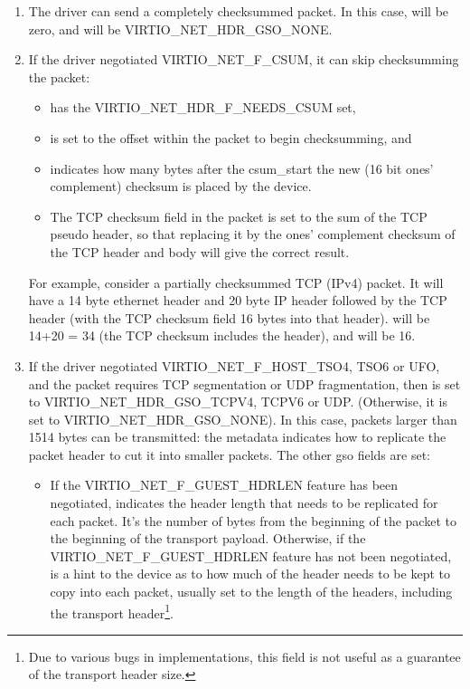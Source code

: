 \begin{enumerate}
\item The driver can send a completely checksummed packet.  In this case,
   will be zero, and  will be VIRTIO_NET_HDR_GSO_NONE.

\item If the driver negotiated VIRTIO_NET_F_CSUM, it can skip
  checksumming the packet:
  \begin{itemize}
  \item {} has the VIRTIO_NET_HDR_F_NEEDS_CSUM set,

  \item {} is set to the offset within the packet to begin checksumming,
    and

  \item {} indicates how many bytes after the csum_start the
    new (16 bit ones' complement) checksum is placed by the device.

  \item The TCP checksum field in the packet is set to the sum
    of the TCP pseudo header, so that replacing it by the ones'
    complement checksum of the TCP header and body will give the
    correct result.
  \end{itemize}

\begin{note}
For example, consider a partially checksummed TCP (IPv4) packet.
It will have a 14 byte ethernet header and 20 byte IP header
followed by the TCP header (with the TCP checksum field 16 bytes
into that header).  will be 14+20 = 34 (the TCP
checksum includes the header), and  will be 16.
\end{note}

\item If the driver negotiated
  VIRTIO_NET_F_HOST_TSO4, TSO6 or UFO, and the packet requires
  TCP segmentation or UDP fragmentation, then 
  is set to VIRTIO_NET_HDR_GSO_TCPV4, TCPV6 or UDP.
  (Otherwise, it is set to VIRTIO_NET_HDR_GSO_NONE). In this
  case, packets larger than 1514 bytes can be transmitted: the
  metadata indicates how to replicate the packet header to cut it
  into smaller packets. The other gso fields are set:

  \begin{itemize}
  \item If the VIRTIO_NET_F_GUEST_HDRLEN feature has been negotiated,
     indicates the header length that needs to be replicated
    for each packet. It's the number of bytes from the beginning of the packet
    to the beginning of the transport payload.
    Otherwise, if the VIRTIO_NET_F_GUEST_HDRLEN feature has not been negotiated,
     is a hint to the device as to how much of the header
    needs to be kept to copy into each packet, usually set to the
    length of the headers, including the transport header\footnote{Due to various bugs in implementations, this field is not useful
as a guarantee of the transport header size.
}.


\end{itemize}
\end{enumerate}
